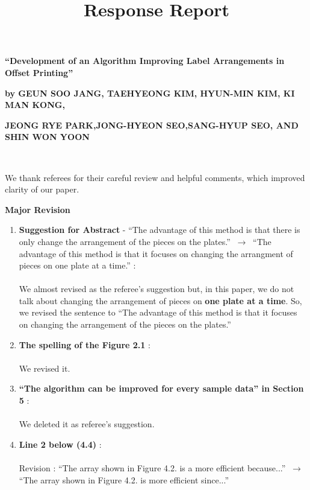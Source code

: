 \documentclass[10pt]{amsart}
\begin{document}
\title[Response Report]
{Response Report}
\maketitle
\centerline{\bf ``Development of an Algorithm Improving Label Arrangements in Offset Printing''}
\centerline{\bf by GEUN SOO JANG, TAEHYEONG KIM, HYUN-MIN KIM, KI MAN KONG,}
\centerline{\bf  JEONG RYE PARK,JONG-HYEON SEO,SANG-HYUP SEO, AND SHIN WON YOON}

\

We thank referees for their careful review and helpful comments, which improved clarity of our paper.
\vspace{.5cm}
\begin{center}
	{\Large\bf Major Revision}
\end{center}
\begin{enumerate}

\item {\bf Suggestion for Abstract} - ``The advantage of this method is that there is only change the arrangement of the pieces on the plates.''
$~\longrightarrow~$ ``The advantage of this method is that it focuses on changing the arrangment of pieces on one plate at a time.'' :\\
~\\
We almost revised as the referee's suggestion but, in this paper, we do not talk about changing the arrangement of pieces on {\bf one plate at a time}.
So, we revised the sentence to ``The advantage of this method is that it focuses on changing the arrangement of the pieces on the plates.''\\

\item {\bf The spelling of the Figure 2.1} : \\
~\\
We revised it.\\

\item {\bf ``The algorithm can be improved for every sample data'' in Section 5} : \\
~\\
We deleted it as referee's suggestion.\\

\item {\bf Line 2 below (4.4)} : \\
~\\
Revision : ``The array shown in Figure 4.2. is a more efficient because...'' $~\longrightarrow~$ ``The array shown in Figure 4.2. is more efficient since...''

\end{enumerate}
\end{document}
